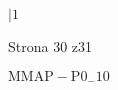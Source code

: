 \documentclass[a4paper,12pt]{article}
\begin{document}
$| 1$

Strona 30 z31

$\mathrm{M}\mathrm{M}\mathrm{A}\mathrm{P}-\mathrm{P}0_{-}10$
\end{document}
